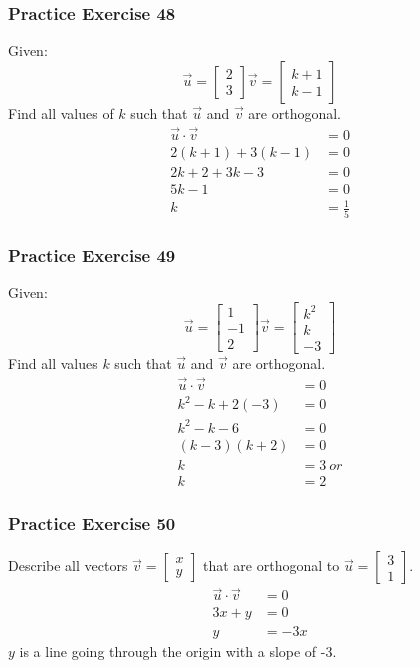 \documentclass[letterpaper, 12pt]{math}
\begin{document}
\subsubsection*{Practice Exercise 48}
Given:
\[ \vec{u} = \begin{bmatrix}2 \\ 3\end{bmatrix}
  \vec{v} = \begin{bmatrix}k+1 \\ k-1\end{bmatrix} \]
Find all values of \( k \) such that \( \vec{u} \) and \( \vec{v} \) are
orthogonal.
\begin{align*}
  \vec{u}\cdot\vec{v} &= 0 \\
  2(k+1)+3(k-1) &= 0 \\
  2k+2+3k-3 &= 0 \\
  5k-1 &= 0 \\
  k &= \frac{1}{5}
\end{align*}

\subsubsection*{Practice Exercise 49}
Given:
\[ \vec{u} = \begin{bmatrix}1 \\ -1 \\ 2\end{bmatrix}
  \vec{v} = \begin{bmatrix}k^2 \\ k \\ -3\end{bmatrix} \]
Find all values \( k \) such that \( \vec{u} \) and \( \vec{v} \) are
orthogonal.
\begin{align*}
  \vec{u}\cdot\vec{v} &= 0 \\
  k^2-k+2(-3) &= 0 \\
  k^2-k-6 &= 0 \\
  (k-3)(k+2) &= 0 \\
  k &= 3\ or \\
  k &= 2
\end{align*}

\subsubsection*{Practice Exercise 50}
Describe all vectors \( \vec{v} = \begin{bmatrix}x \\ y\end{bmatrix} \) that
are orthogonal to \( \vec{u} = \begin{bmatrix}3 \\ 1\end{bmatrix} \).
\begin{align*}
  \vec{u}\cdot\vec{v} &= 0 \\
  3x+y &= 0 \\
  y &= -3x
\end{align*}
\( y \) is a line going through the origin with a slope of -3.
\end{document}
